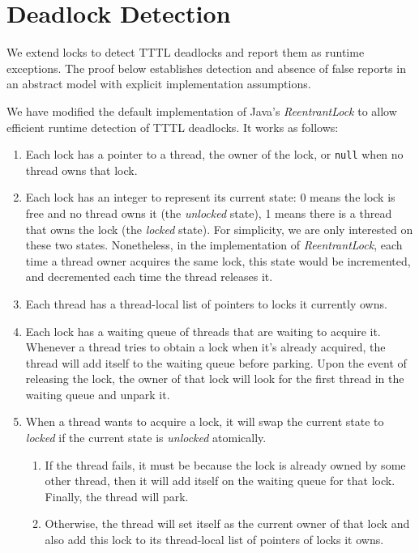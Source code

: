 \section{Deadlock Detection}

We extend locks to detect TTTL deadlocks and report them as runtime exceptions.
The proof below establishes detection and absence of false reports in an abstract model with explicit implementation assumptions.

We have modified the default implementation of Java's \emph{ReentrantLock} to allow efficient runtime detection of TTTL deadlocks. It works as follows:

\begin{enumerate}
\item Each lock has a pointer to a thread, the owner of the lock, or {\tt null} when no thread owns that lock.
\item Each lock has an integer to represent its current state: 0 means the lock is free and no thread owns it (the \emph{unlocked} state), 1 means there is a thread that owns the lock (the \emph{locked} state). For simplicity, we are only interested on these two states. Nonetheless, in the implementation of \emph{ReentrantLock}, each time a thread owner acquires the same lock, this state would be incremented, and decremented each time the thread releases it.
\item Each thread has a thread-local list of pointers to locks it currently owns.
\item Each lock has a waiting queue of threads that are waiting to acquire it. Whenever a thread tries to obtain a lock when it's already acquired, the thread will add itself to the waiting queue before parking. Upon the event of releasing the lock, the owner of that lock will look for the first thread in the waiting queue and unpark it.
\item When a thread wants to acquire a lock, it will swap the current state to \emph{locked} if the current state is \emph{unlocked} atomically.
\begin{enumerate}
\item If the thread fails, it must be because the lock is already owned by some other thread, then it will add itself on the waiting queue for that lock. Finally, the thread will park.
\item Otherwise, the thread will set itself as the current owner of that lock and also add this lock to its thread-local list of pointers of locks it owns.
\end{enumerate}

\end{enumerate}
